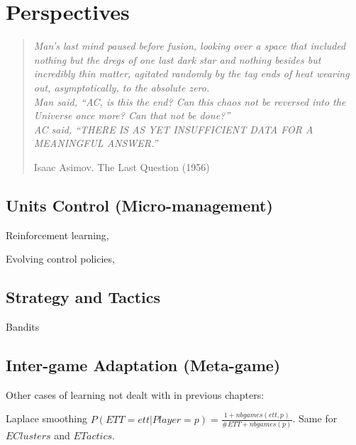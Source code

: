 \chapter{Perspectives}
\chaptertoc

\begin{quotation}\textit{
Man's last mind paused before fusion, looking over a space that included nothing but the dregs of one last dark star and nothing besides but incredibly thin matter, agitated randomly by the tag ends of heat wearing out, asymptotically, to the absolute zero.\\
Man said, ``AC, is this the end? Can this chaos not be reversed into the Universe once more? Can that not be done?''\\
AC said, ``THERE IS AS YET INSUFFICIENT DATA FOR A MEANINGFUL ANSWER.''
}
\begin{flushright}Isaac Asimov. The Last Question (1956)\end{flushright}\end{quotation}

\section{Units Control (Micro-management)}
Reinforcement learning, \citep{Marthi05concurrenthierarchical}

Evolving control policies, \citep{Miles2007}

\section{Strategy and Tactics}

Bandits

\section{Inter-game Adaptation (Meta-game)}
Other cases of learning not dealt with in previous chapters:

Laplace smoothing $P(ETT=ett|Player=p)= \frac{1 + nbgames(ett,p)}{\#ETT + nbgames(p)}$. Same for $EClusters$ and $ETactics$.





